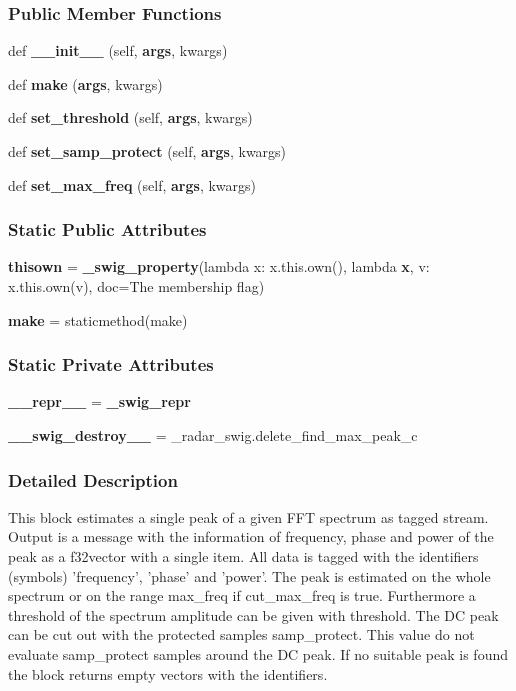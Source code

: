 \subsubsection*{Public Member Functions}
\begin{DoxyCompactItemize}
\item 
def {\bf \+\_\+\+\_\+init\+\_\+\+\_\+} (self, {\bf args}, kwargs)
\item 
def {\bf make} ({\bf args}, kwargs)
\item 
def {\bf set\+\_\+threshold} (self, {\bf args}, kwargs)
\item 
def {\bf set\+\_\+samp\+\_\+protect} (self, {\bf args}, kwargs)
\item 
def {\bf set\+\_\+max\+\_\+freq} (self, {\bf args}, kwargs)
\end{DoxyCompactItemize}
\subsubsection*{Static Public Attributes}
\begin{DoxyCompactItemize}
\item 
{\bf thisown} = {\bf \+\_\+swig\+\_\+property}(lambda x\+: x.\+this.\+own(), lambda {\bf x}, v\+: x.\+this.\+own(v), doc=\textquotesingle{}The membership flag\textquotesingle{})
\item 
{\bf make} = staticmethod(make)
\end{DoxyCompactItemize}
\subsubsection*{Static Private Attributes}
\begin{DoxyCompactItemize}
\item 
{\bf \+\_\+\+\_\+repr\+\_\+\+\_\+} = {\bf \+\_\+swig\+\_\+repr}
\item 
{\bf \+\_\+\+\_\+swig\+\_\+destroy\+\_\+\+\_\+} = \+\_\+radar\+\_\+swig.\+delete\+\_\+find\+\_\+max\+\_\+peak\+\_\+c
\end{DoxyCompactItemize}


\subsubsection{Detailed Description}
\begin{DoxyVerb}This block estimates a single peak of a given FFT spectrum as tagged stream. Output is a message with the information of frequency, phase and power of the peak as a f32vector with a single item. All data is tagged with the identifiers (symbols) 'frequency', 'phase' and 'power'. The peak is estimated on the whole spectrum or on the range max_freq if cut_max_freq is true. Furthermore a threshold of the spectrum amplitude can be given with threshold. The DC peak can be cut out with the protected samples samp_protect. This value do not evaluate samp_protect samples around the DC peak. If no suitable peak is found the block returns empty vectors with the identifiers.\end{DoxyVerb}
 

